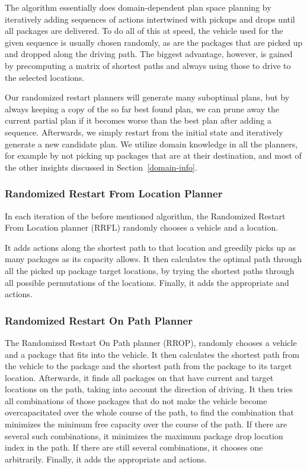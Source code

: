 The algorithm essentially does domain-dependent plan space planning
by iteratively adding sequences of \drive{} actions
intertwined with pickups and drops
until all packages are delivered.
To do all of this at speed, the vehicle used for the given sequence
is usually chosen randomly, as are the packages that are picked up and dropped along the driving path.
The biggest advantage, however, is gained by precomputing
a matrix of shortest paths and always using those to drive to the
selected locations.

Our randomized restart planners will generate many suboptimal plans,
but by always keeping a copy of the so far best found plan,
we can prune away the current partial plan if it becomes
worse than the best plan after adding a sequence.
Afterwards, we simply restart
from the initial state and iteratively generate a new candidate plan.
We utilize domain knowledge in all the planners,
for example by not picking up packages that are at their destination,
and most of the other insights discussed in Section~\ref{domain-info}.

\subsubsection{Randomized Restart From Location Planner}\label{rrfl}

In each iteration of the before mentioned algorithm,
the Randomized Restart From Location planner (RRFL)
randomly chooses a vehicle and a location.

It adds \drive{} actions along the shortest path
to that location and greedily picks up as many packages as
its capacity allows.
It then calculates the optimal
path through all the picked up package target locations,
by trying the shortest paths through all possible permutations
of the locations.
Finally, it adds the appropriate \drive{} and \drop{} actions.

\subsubsection{Randomized Restart On Path Planner}\label{rrop}

The Randomized Restart On Path planner (RROP),
randomly chooses a vehicle
and a package that fits into the vehicle.
It then calculates the shortest path from the vehicle
to the package
and the shortest path from the package to its target location.
Afterwards, it finds all packages on that have current and target locations on the path, taking into account the direction of driving.
It then tries all combinations of
those packages that do not make the vehicle become
overcapacitated over the whole course
of the path,
to find the combination that minimizes the minimum
free capacity over the course of the path.
If there are several such combinations, it minimizes the
maximum package drop location index in the path.
If there are still several combinations, it chooses one arbitrarily.
Finally, it adds the appropriate \drive{} and \drop{} actions.

